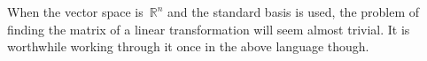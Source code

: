 %
%
%

When the vector space is~${\mathbb R^n}$ and the standard basis is used,  the problem of finding the matrix of a 
linear transformation will seem almost trivial. It is worthwhile working through it once in the above language though.


